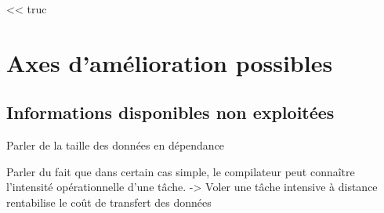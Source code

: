 \begin{savequote}[6cm]
<< truc
\end{savequote}

\chapter{Axes d'amélioration possibles}\label{chap:perspectives}
\chaptertoc

\section{Informations disponibles non exploitées}


Parler de la taille des données en dépendance

Parler du fait que dans certain cas simple, le compilateur peut connaître l'intensité opérationnelle d'une tâche.
-> Voler une tâche intensive à distance rentabilise le coût de transfert des données

%


